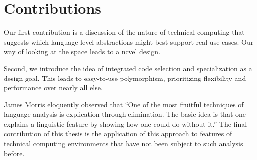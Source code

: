 


\section{Contributions}

Our first contribution is a discussion of the nature of technical computing
that suggests which language-level abstractions might best support real use
cases. Our way of looking at the space leads to a novel design.


Second, we introduce the idea of integrated code selection and specialization
as a design goal. This leads to easy-to-use polymorphism, prioritizing
flexibility and performance over nearly all else.



James Morris eloquently observed that
``One of the most fruitful techniques of language analysis is explication through
elimination. The basic idea is that one explains a linguistic feature by showing
how one could do without it.'' \cite{morris}
The final contribution of this thesis is the application of this approach to features
of technical computing environments that have not been subject to such analysis
before.

